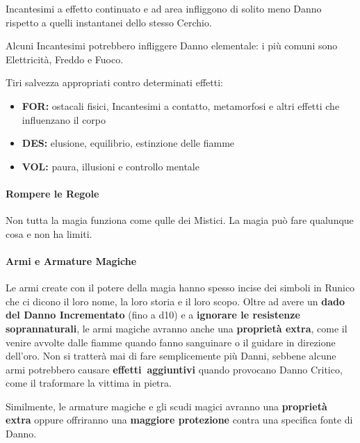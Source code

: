 \documentclass[itdr]{subfiles}
\begin{document}
Incantesimi a effetto continuato e ad area infliggono di solito meno Danno rispetto a quelli instantanei dello stesso Cerchio.

Alcuni Incantesimi potrebbero infliggere Danno elementale: i più comuni sono Elettricità, Freddo e Fuoco.

Tiri salvezza appropriati contro determinati effetti:
\begin{itemize}
	\item \textbf{FOR:} ostacali fisici, Incantesimi a contatto, metamorfosi e altri effetti che influenzano il corpo
	\item \textbf{DES:} elusione, equilibrio, estinzione delle fiamme
	\item \textbf{VOL:} paura, illusioni e controllo mentale
\end{itemize}

\vfill

\paragraph{Rompere le Regole}
Non tutta la magia funziona come qulle dei Mistici. La magia può fare qualunque cosa e non ha limiti.

\vfill
\break

\paragraph{Armi e Armature Magiche}
Le armi create con il potere della magia hanno spesso incise dei simboli in Runico che ci dicono il loro nome, la loro storia e il loro scopo. Oltre ad avere un \textbf{dado del Danno Incrementato} (fino a d10) e a \textbf{ignorare le resistenze soprannaturali}, le armi magiche avranno anche una \textbf{proprietà extra}, come il venire avvolte dalle fiamme quando fanno sanguinare o il guidare in direzione dell'oro. Non si tratterà mai di \mbox{fare} semplicemente più Danni, sebbene alcune armi potrebbero causare \mbox{\textbf{effetti aggiuntivi}} quando provocano Danno Critico, come il traformare la vittima in pietra.

Similmente, le armature magiche e gli scudi magici avranno una \textbf{proprietà extra} oppure offriranno una \textbf{maggiore protezione} contra una specifica fonte di Danno.

\vfill
\end{document}
